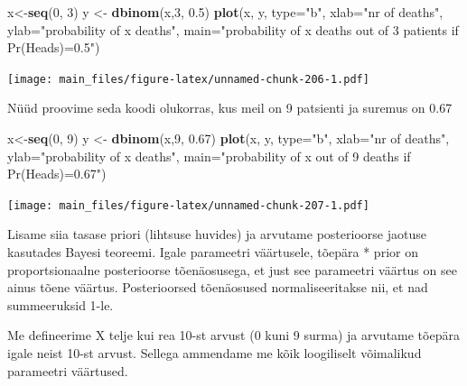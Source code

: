 \documentclass[]{book}
\newenvironment{Shaded}{\begin{snugshade}}{\end{snugshade}}
\newcommand{\KeywordTok}[1]{\textcolor[rgb]{0.13,0.29,0.53}{\textbf{#1}}}
\newcommand{\DataTypeTok}[1]{\textcolor[rgb]{0.13,0.29,0.53}{#1}}
\newcommand{\DecValTok}[1]{\textcolor[rgb]{0.00,0.00,0.81}{#1}}
\newcommand{\FloatTok}[1]{\textcolor[rgb]{0.00,0.00,0.81}{#1}}
\newcommand{\StringTok}[1]{\textcolor[rgb]{0.31,0.60,0.02}{#1}}
\newcommand{\NormalTok}[1]{#1}
\begin{document}
\begin{Shaded}
\begin{Highlighting}[]
\NormalTok{x<-}\KeywordTok{seq}\NormalTok{(}\DecValTok{0}\NormalTok{, }\DecValTok{3}\NormalTok{)}
\NormalTok{y <-}\StringTok{ }\KeywordTok{dbinom}\NormalTok{(x,}\DecValTok{3}\NormalTok{, }\FloatTok{0.5}\NormalTok{)}
\KeywordTok{plot}\NormalTok{(x, y, }\DataTypeTok{type=}\StringTok{"b"}\NormalTok{, }\DataTypeTok{xlab=}\StringTok{"nr of deaths"}\NormalTok{, }\DataTypeTok{ylab=}\StringTok{"probability of x deaths"}\NormalTok{, }\DataTypeTok{main=}\StringTok{"probability of x deaths out of 3 patients if Pr(Heads)=0.5"}\NormalTok{)}
\end{Highlighting}
\end{Shaded}

\texttt{[image: main\_files/figure-latex/unnamed-chunk-206-1.pdf]}

Nüüd proovime seda koodi olukorras, kus meil on 9 patsienti ja suremus
on 0.67

\begin{Shaded}
\begin{Highlighting}[]
\NormalTok{x<-}\KeywordTok{seq}\NormalTok{(}\DecValTok{0}\NormalTok{, }\DecValTok{9}\NormalTok{)}
\NormalTok{y <-}\StringTok{ }\KeywordTok{dbinom}\NormalTok{(x,}\DecValTok{9}\NormalTok{, }\FloatTok{0.67}\NormalTok{)}
\KeywordTok{plot}\NormalTok{(x, y, }\DataTypeTok{type=}\StringTok{"b"}\NormalTok{, }\DataTypeTok{xlab=}\StringTok{"nr of deaths"}\NormalTok{, }\DataTypeTok{ylab=}\StringTok{"probability of x deaths"}\NormalTok{, }\DataTypeTok{main=}\StringTok{"probability of x out of 9 deaths if Pr(Heads)=0.67"}\NormalTok{)}
\end{Highlighting}
\end{Shaded}

\texttt{[image: main\_files/figure-latex/unnamed-chunk-207-1.pdf]}

Lisame siia tasase priori (lihtsuse huvides) ja arvutame posterioorse
jaotuse kasutades Bayesi teoreemi. Igale parameetri väärtusele, tõepära
* prior on proportsionaalne posterioorse tõenäosusega, et just see
parameetri väärtus on see ainus tõene väärtus. Posterioorsed tõenäosused
normaliseeritakse nii, et nad summeeruksid 1-le.

Me defineerime X telje kui rea 10-st arvust (0 kuni 9 surma) ja arvutame
tõepära igale neist 10-st arvust. Sellega ammendame me kõik loogiliselt
võimalikud parameetri väärtused.
\end{document}
